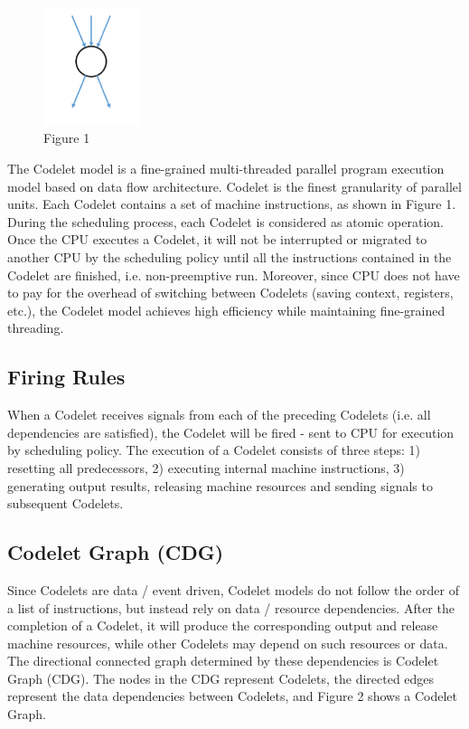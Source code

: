 
\begin{figure}
    \centering
    \caption{Figure 1}
    \includegraphics[width=0.25\textwidth]{Fig/figure1.png}
\end{figure}




The Codelet model is a fine-grained multi-threaded parallel program execution model based on data flow architecture. Codelet is the finest granularity of parallel units. Each Codelet contains a set of machine instructions, as shown in Figure 1. During the scheduling process, each Codelet is considered as atomic operation. Once the CPU executes a Codelet, it will not be interrupted or migrated to another CPU by the scheduling policy until all the instructions contained in the Codelet are finished, i.e. non-preemptive run. Moreover, since CPU does not have to pay for the overhead of switching between Codelets (saving context, registers, etc.), the Codelet model achieves high efficiency while maintaining fine-grained threading.

\subsection*{Firing Rules}
When a Codelet receives signals from each of the preceding Codelets (i.e. all dependencies are satisfied), the Codelet will be fired - sent to CPU for execution by scheduling policy. The execution of a Codelet consists of three steps: 1) resetting all predecessors, 2) executing internal machine instructions, 3) generating output results, releasing machine resources and sending signals to subsequent Codelets.
\subsection*{Codelet Graph (CDG)}
Since Codelets are data / event driven, Codelet models do not follow the order of a list of instructions, but instead rely on data / resource dependencies. After the completion of a Codelet, it will produce the corresponding output and release machine resources, while other Codelets may depend on such resources or data. The directional connected graph determined by these dependencies is Codelet Graph (CDG). The nodes in the CDG represent Codelets, the directed edges represent the data dependencies between Codelets, and Figure 2 shows a Codelet Graph.
